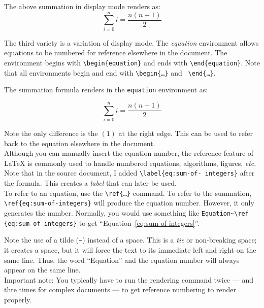 \documentclass{article}
\begin{document}
  The above summation in display mode renders as:
  \[
    \sum_{i=0}^n i=\frac{n(n+1)}{2}
  \]
  \vskip6pt

  The third variety is a variation of display mode. The \emph{equation}
  environment allows equations to be numbered for reference elsewhere in the
  document. The environment begins with {\tt \textbackslash begin\{equation\}}
  and ends with {\tt \textbackslash end\{equation\}}. Note that all environments
  begin and end with {\tt \textbackslash begin\{\ldots\}} and {\tt
  \textbackslash end\{\ldots\}}.

  The summation formula renders in the {\tt equation} environment as:

  \begin{equation}
    \sum_{i=0}^n i=\frac{n(n+1)}{2}\label{eq:sum-of-integers}
\end{equation}

Note the only difference is the $(1)$ at the right edge. This can be used to
refer back to the equation elsewhere in the document.\\

Although you can manually insert the equation number, the reference feature of
\LaTeX{} is commonly used to handle numbered equations, algorithms, figures,
\emph{etc}.
Note that in the source document, I added {\tt \textbackslash label\{eq:sum-of-%
integers\}} after the formula. This creates a \emph{label} that can later be
used.\\

To refer to an equation, use the {\tt \textbackslash ref\{\ldots\}} command.
To refer to the summation, {\tt \textbackslash ref\{eq:sum-of-integers\}} will
produce the equation number. However, it only generates the number. Normally,
you would use something like {\tt Equation\textasciitilde \textbackslash ref%
\{eq:sum-of-integers\}} to get ``Equation~\ref{eq:sum-of-integers}''.\newpage

Note the use of a tilde ({\tt \textasciitilde}) instead of a space. This is a
\emph{tie} or non-breaking space; it creates a space, but it will force the text
to its immediate left and right on the same line. Thus, the word ``Equation''
and the equation number will always appear on the same line.\\

Important note: You typically have to run the rendering command twice --- and
thre times for complex documents --- to get reference numbering to render
properly.\\
\end{document}
